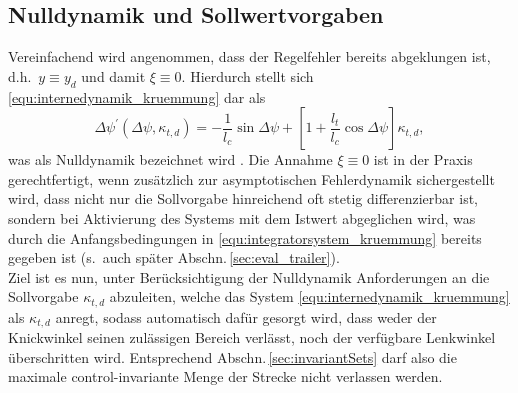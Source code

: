 \subsection{Nulldynamik und Sollwertvorgaben} \label{sec:nulldynamik}
Vereinfachend wird angenommen, dass der Regelfehler bereits abgeklungen ist, d.h.\ $y\equiv y_d$ und damit $\xi \equiv 0$. Hierdurch stellt sich \eqref{equ:internedynamik_kruemmung} dar als
\begin{equation}
	\Delta\psi^\prime(\Delta\psi, \kappa_{t,d}) = -\frac{1}{l_c}\sin\Delta\psi + \left[1+\dfrac{l_t}{l_c}\cos\Delta\psi\right]\kappa_{t,d}, \label{equ:zerodynamics}
\end{equation}
was als \sog Nulldynamik bezeichnet wird \cite{svaricek2006nln}. Die Annahme $\xi \equiv 0$ ist in der Praxis gerechtfertigt, wenn zusätzlich zur asymptotischen Fehlerdynamik sichergestellt wird, dass nicht nur die Sollvorgabe hinreichend oft stetig differenzierbar ist, sondern bei Aktivierung des Systems mit dem Istwert abgeglichen wird, was durch die Anfangsbedingungen in \eqref{equ:integratorsystem_kruemmung} bereits gegeben ist (s.\ auch später Abschn.\,\ref{sec:eval_trailer}). \\
Ziel ist es nun, unter Berücksichtigung der Nulldynamik
Anforderungen an die Sollvorgabe $\kappa_{t,d}$ abzuleiten, welche das Sys\-tem \eqref{equ:internedynamik_kruemmung} als $\kappa_{t,d}$ anregt, sodass automatisch dafür gesorgt wird, dass weder der Knickwinkel seinen zulässigen Bereich verlässt, noch der verfügbare Lenkwinkel überschritten wird. Entsprechend Abschn.\,\ref{sec:invariantSets} darf also die maximale control-invariante Menge der Strecke nicht verlassen werden.

